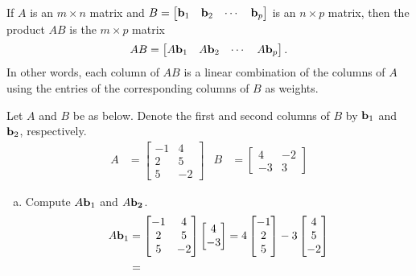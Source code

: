 \begin{boxme}
	If $A$ is an $m\times n$ matrix and $B=\begin{bmatrix}\boldsymbol{\mathbf{b}}_1&\boldsymbol{\mathbf{b}}_2&\cdots&\boldsymbol{\mathbf{b}}_p\end{bmatrix}$ is an $n\times p$ matrix, then the product $AB$ is the $m\times p$ matrix
	$$ AB = \begin{bmatrix}A\boldsymbol{\mathbf{b}}_1&A\boldsymbol{\mathbf{b}}_2&\cdots&A\boldsymbol{\mathbf{b}}_p\end{bmatrix}. $$
	In other words, each column of $AB$ is a linear combination of the columns of $A$ using the entries of the corresponding columns of $B$ as weights.
\end{boxme}
\begin{exercise} %
	Let $A$ and $B$ be as below. Denote the first and second columns of $B$ by $\boldsymbol{\mathbf{b}}_1$ and $\boldsymbol{\mathbf{b}}_2$, respectively.
	\begin{align*}
	A &= \begin{bmatrix}-1&4\\2&5\\5&-2\end{bmatrix} &
	B &= \begin{bmatrix}4&-2\\-3&3\end{bmatrix}
	\end{align*}
	\begin{multicols}{2}
		\begin{enumerate}[(a)]
			\item Compute $A\boldsymbol{\mathbf{b}}_1$ and $A\boldsymbol{\mathbf{b_2}}$.
			\begin{align*}
			A\vect{b}_1 &=
			\begin{bmatrix}-1&4\\2&5\\5&-2\end{bmatrix}
			\begin{bmatrix}4\\-3\end{bmatrix}
			= 4\begin{bmatrix}-1\\2\\5\end{bmatrix}
			-3\begin{bmatrix}4\\5\\-2\end{bmatrix} \\
			&=

\end{align*}
\end{enumerate}
\end{multicols}
\end{exercise}

